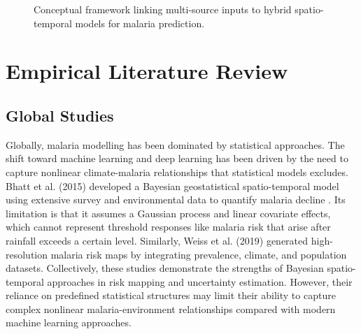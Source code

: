 \begin{figure}[H]
{
	}
	\caption{Conceptual framework linking multi-source inputs to hybrid spatio-temporal models for malaria prediction.}
	\label{fig:conceptual_framework}
\end{figure}
\FloatBarrier
\vspace{-0.3cm}
\section{Empirical Literature Review}

\subsection{Global Studies}

Globally, malaria modelling has been dominated by statistical approaches. The shift toward machine learning and deep learning has been driven by the need to capture nonlinear climate-malaria relationships that statistical models excludes. Bhatt et al. (2015) \cite{Bhatt2015} developed a Bayesian geostatistical spatio-temporal model using extensive survey and environmental data to quantify malaria decline . Its limitation is that it assumes a Gaussian process and linear covariate effects, which cannot represent threshold responses like malaria risk that  arise after rainfall exceeds a certain level. Similarly, Weiss et al. (2019) \cite{Weiss2019Mapping} generated high-resolution malaria risk maps by integrating prevalence, climate, and population datasets.  Collectively, these studies demonstrate the strengths of Bayesian spatio-temporal approaches in risk mapping and uncertainty estimation. However, their reliance on predefined statistical structures may limit their ability to capture complex nonlinear malaria-environment relationships compared with modern machine learning approaches.
